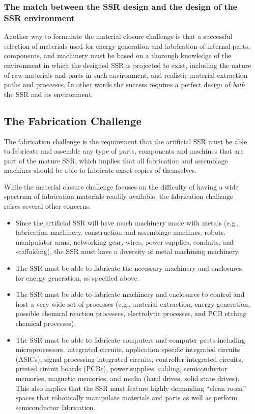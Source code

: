 \subsubsection[The match between the SSR design and the design of the
SSR environment]{The match between the SSR design and the design of the
SSR environment}

Another way to formulate the material closure challenge is that a
successful selection of materials used for energy generation and 
fabrication of internal parts, components, and machinery must be
based on a thorough knowledge of the environment in which the designed
SSR is projected to exist, including the nature of raw materials and parts in
such environment, and realistic material extraction paths
and processes. 
In other words the success requires a
perfect design of \emph{both} the SSR and its environment.

\subsection[The Fabrication Challenge]{The Fabrication Challenge}

The fabrication challenge is
the requirement that the artificial SSR must be able to
fabricate and assemble any type of parts, components and machines that
are part of the mature SSR, which implies that all fabrication and
assemblage machines should be able to fabricate exact copies of
themselves.

While the material closure challenge focuses on the difficulty of having
a wide spectrum of fabrication materials readily available, the
fabrication challenge raises several other concerns.

\begin{itemize}
\item Since the artificial SSR will have much machinery made with
metals (e.g., fabrication machinery, construction and assemblage machines,
robots, manipulator arms, networking gear,  wires, power supplies,
conduits, and scaffolding), the SSR must have a diversity of metal machining machinery.
\item The SSR must be able to fabricate the necessary machinery and enclosures for
energy generation, as specified above.
\item The SSR must be able to fabricate machinery and enclosures
to control and host a very wide set of processes
(e.g., material extraction, energy generation, possible chemical reaction
processes, electrolytic processes, and PCB etching chemical processes).
\item The SSR must be able to fabricate computers and computer parts
including microprocessors, integrated circuits, application specific
integrated circuits (ASICs), signal processing integrated circuits,
controller integrated circuits, printed circuit boards (PCBs), power
supplies, cabling, semiconductor memories, magnetic memories, and media
(hard drives, solid state drives). This also implies that the SSR must
feature highly demanding ``clean room'' spaces that robotically manipulate
materials and parts as well as perform semiconductor fabrication.
\end{itemize}

